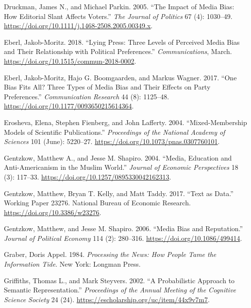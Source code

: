 \documentclass[
  12pt,
]{article}
\newlength{\cslhangindent}
\newlength{\cslentryspacingunit} %
\newenvironment{CSLReferences}[2] %
 {%
  \setlength{\parindent}{0pt}
  \ifodd #1
  \let\oldpar\par
  \def\par{\hangindent=\cslhangindent\oldpar}
  \fi
  \setlength{\parskip}{#2\cslentryspacingunit}
 }%
 {}
\begin{document}
\begin{CSLReferences}{1}{0}
\leavevmode{}%
Druckman, James N., and Michael Parkin. 2005. {``The Impact of Media
Bias: How Editorial Slant Affects Voters.''} \emph{The Journal of
Politics} 67 (4): 1030--49.
\url{https://doi.org/10.1111/j.1468-2508.2005.00349.x}.

\leavevmode{}%
Eberl, Jakob-Moritz. 2018. {``Lying Press: Three Levels of Perceived
Media Bias and Their Relationship with Political Preferences.''}
\emph{Communications}, March.
\url{https://doi.org/10.1515/commun-2018-0002}.

\leavevmode{}%
Eberl, Jakob-Moritz, Hajo G. Boomgaarden, and Markus Wagner. 2017.
{``One Bias Fits All? Three Types of Media Bias and Their Effects on
Party Preferences.''} \emph{Communication Research} 44 (8): 1125--48.
\url{https://doi.org/10.1177/0093650215614364}.

\leavevmode{}%
Erosheva, Elena, Stephen Fienberg, and John Lafferty. 2004.
{``Mixed-Membership Models of Scientific Publications.''}
\emph{Proceedings of the National Academy of Sciences} 101 (June):
5220--27. \url{https://doi.org/10.1073/pnas.0307760101}.

\leavevmode{}%
Gentzkow, Matthew A., and Jesse M. Shapiro. 2004. {``Media, Education
and Anti-Americanism in the Muslim World.''} \emph{Journal of Economic
Perspectives} 18 (3): 117--33.
\url{https://doi.org/10.1257/0895330042162313}.

\leavevmode{}%
Gentzkow, Matthew, Bryan T. Kelly, and Matt Taddy. 2017. {``Text as
Data.''} Working Paper 23276. National Bureau of Economic Research.
\url{https://doi.org/10.3386/w23276}.

\leavevmode{}%
Gentzkow, Matthew, and Jesse M. Shapiro. 2006. {``Media Bias and
Reputation.''} \emph{Journal of Political Economy} 114 (2): 280--316.
\url{https://doi.org/10.1086/499414}.

\leavevmode{}%
Graber, Doris Appel. 1984. \emph{Processing the News: How People Tame
the Information Tide}. New York: Longman Press.

\leavevmode{}%
Griffiths, Thomas L., and Mark Steyvers. 2002. {``A Probabilistic
Approach to Semantic Representation.''} \emph{Proceedings of the Annual
Meeting of the Cognitive Science Society} 24 (24).
\url{https://escholarship.org/uc/item/44x9v7m7}.


\end{CSLReferences}
\end{document}
